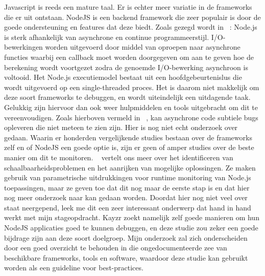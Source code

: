 Javascript is reeds een mature taal. Er is echter meer variatie in de frameworks die er uit ontstaan. NodeJS is een backend framework die zeer populair is door de goede ondersteuning en features dat deze biedt. Zoals gezegd wordt in ~\autocite{Runtime2017}: Node.js is sterk afhankelijk van asynchrone en continue programmeerstijl. I/O-bewerkingen worden uitgevoerd door middel van oproepen naar asynchrone functies waarbij een callback moet worden doorgegeven om aan te geven hoe de berekening wordt voortgezet zodra de genoemde I/O-bewerking asynchroon is voltooid. Het Node.js executiemodel bestaat uit een hoofdgebeurtenislus die wordt uitgevoerd op een single-threaded proces.
Het is daarom niet makkelijk om deze soort frameworks te debuggen, en wordt uiteindelijk een uitdagende taak. Gelukkig zijn hiervoor dan ook weer hulpmiddelen en tools uitgebracht om dit te vereenvoudigen. Zoals hierboven vermeld in ~\autocite{Runtime2017}, kan asynchrone code subtiele bugs opleveren die niet meteen te zien zijn.  Hier is nog niet echt onderzoek over gedaan. Waarin er honderden vergelijkende studies bestaan over de frameworks zelf en of NodeJS een goede optie is, zijn er geen of amper studies over de beste manier om dit te monitoren. ~\autocite{Runtime2017} vertelt ons meer over  het identificeren van schaalbaarheidsproblemen en het aanrijken van mogelijke oplossingen. Ze maken gebruik van parametrische uitdrukkingen voor runtime monitoring van Node.js toepassingen, maar ze geven toe dat dit nog maar de eerste stap is en dat hier nog meer onderzoek naar kan gedaan worden. Doordat hier nog niet veel over staat neergepend, leek me dit een zeer interessant onderwerp dat hand in hand werkt met mijn stageopdracht. Kayzr zoekt namelijk zelf goede manieren om hun NodeJS applicaties goed te kunnen debuggen, en deze studie zou zeker een goede bijdrage zijn aan deze soort doelgroep. Mijn onderzoek zal zich onderscheiden door een goed overzicht te behouden in die ongedocumenteerde zee van beschikbare frameworks, tools en software, waardoor deze studie kan gebruikt worden als een guideline voor best-practices. 



